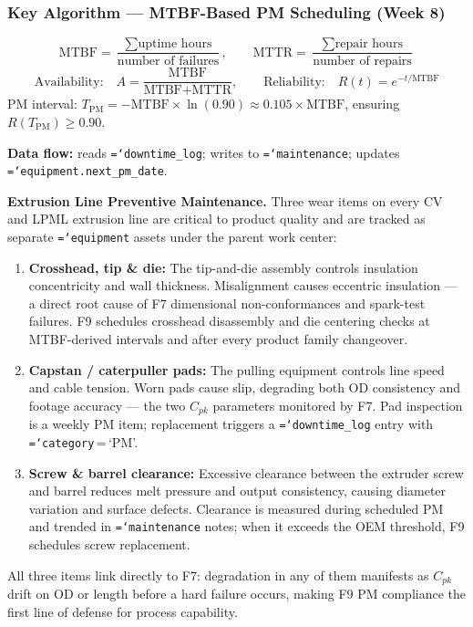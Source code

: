 \documentclass[11pt]{article}
\newcommand{\tfield}[1]{\texttt{\hyphenchar\font=`\-\relax #1}}
\begin{document}
\subsubsection*{Key Algorithm --- MTBF-Based PM Scheduling (Week 8)}

\begin{eqbox}
\[
\text{MTBF} = \frac{\sum \text{uptime hours}}{\text{number of failures}}, \qquad \text{MTTR} = \frac{\sum \text{repair hours}}{\text{number of repairs}}
\]
\[
\text{Availability:}\quad A = \frac{\text{MTBF}}{\text{MTBF} + \text{MTTR}}, \qquad \text{Reliability:}\quad R(t) = e^{-t/\text{MTBF}}
\]
PM interval: $T_{\text{PM}} = -\text{MTBF} \times \ln(0.90) \approx 0.105 \times \text{MTBF}$, ensuring $R(T_{\text{PM}}) \geq 0.90$.

\textbf{Data flow:} reads \tfield{downtime\_log}; writes to \tfield{maintenance}; updates \tfield{equipment.next\_pm\_date}.
\end{eqbox}

\textbf{Extrusion Line Preventive Maintenance.}
Three wear items on every CV and LPML extrusion line are critical to product quality and are tracked as separate \tfield{equipment} assets under the parent work center:
\begin{enumerate}[leftmargin=2em, itemsep=1pt]
\item \textbf{Crosshead, tip \& die:}  The tip-and-die assembly controls insulation concentricity and wall thickness.  Misalignment causes eccentric insulation --- a direct root cause of F7 dimensional non-conformances and spark-test failures.  F9 schedules crosshead disassembly and die centering checks at MTBF-derived intervals and after every product family changeover.
\item \textbf{Capstan / caterpuller pads:}  The pulling equipment controls line speed and cable tension.  Worn pads cause slip, degrading both OD consistency and footage accuracy --- the two $C_{pk}$ parameters monitored by F7.  Pad inspection is a weekly PM item; replacement triggers a \tfield{downtime\_log} entry with \tfield{category}\,=\,`PM'.
\item \textbf{Screw \& barrel clearance:}  Excessive clearance between the extruder screw and barrel reduces melt pressure and output consistency, causing diameter variation and surface defects.  Clearance is measured during scheduled PM and trended in \tfield{maintenance} notes; when it exceeds the OEM threshold, F9 schedules screw replacement.
\end{enumerate}
All three items link directly to F7: degradation in any of them manifests as $C_{pk}$ drift on OD or length before a hard failure occurs, making F9 PM compliance the first line of defense for process capability.
\end{document}
